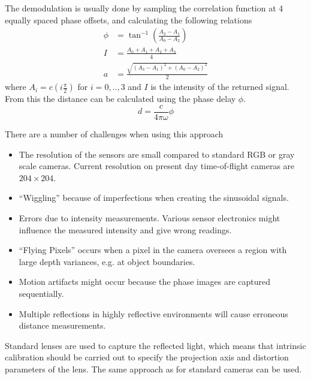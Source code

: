 The demodulation is usually done by sampling the correlation function at 4 equally spaced
phase offsets, and calculating the following relations
\begin{equation}
    \begin{aligned}
        \phi &= \tan^{-1} (\frac{A_3 - A_1}{A_0 - A_2}) \\
        I &= \frac{A_0 + A_1 + A_2 + A_3}{4} \\
        a &= \frac{\sqrt{(A_3 - A_1)^2 + (A_0 - A_2)^2}}{2}
    \end{aligned}
\end{equation}
where $A_i = c(i \frac{\pi}{2})$ for $ i = 0,..,3$ and $I$ is the intensity of the returned 
signal. From this the distance can be calculated using the phase delay $\phi$. 
\begin{equation}
    d = \frac{c}{4 \pi \omega} \phi
\end{equation}

There are a number of challenges when using this approach
\cite{time-of-flight-comp-graphics}
\begin{itemize}
    \item The resolution of the sensors are small compared to standard RGB or gray scale
        cameras. Current resolution on present day time-of-flight cameras are $204 \times
        204$. 
    \item ``Wiggling'' because of imperfections when creating the sinusoidal signals.
    \item Errors due to intensity measurements. Various sensor electronics might influence
        the measured intensity and give wrong readings.
    \item ``Flying Pixels'' occurs when a pixel in the camera oversees a region with
        large depth variances, e.g. at object boundaries.
    \item Motion artifacts might occur because the phase images are captured sequentially.
    \item Multiple reflections in highly reflective environments will cause erroneous
        distance measurements.
\end{itemize}

Standard lenses are used to capture the reflected light, which means that intrinsic
calibration should be carried out to specify the projection axis and distortion parameters
of the lens. The same approach as for standard cameras can be used. \cite{time-of-flight-comp-graphics}


